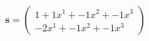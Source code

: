 \documentclass[preview]{standalone}
\begin{document}
\begin{align*}
\mathbf{s} = \begin{pmatrix}1 + 1x^{1} + -1x^{2} + -1x^{3} \\ -2x^{1} + -1x^{2} + -1x^{3}\end{pmatrix}
\end{align*}
\end{document}
